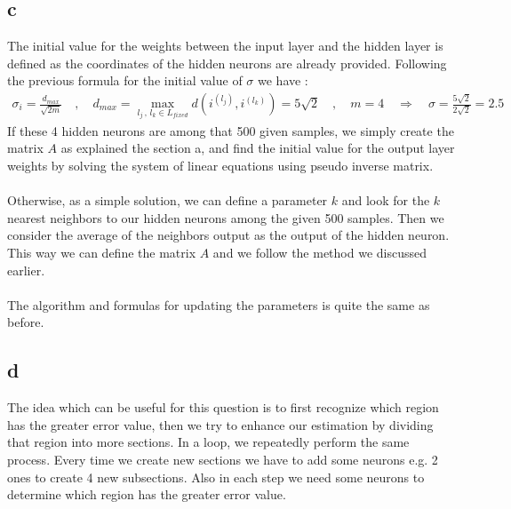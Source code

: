 \documentclass[]{article}
\begin{document}
	\subsection*{c}
	The initial value for the weights between the input layer and the hidden layer is defined as the coordinates of the hidden neurons are already provided. Following the previous formula for the initial value of $\sigma$ we have :
	\begin{align*}
		\sigma_i = \frac{d_{max}}{\sqrt{2m}} \quad , \quad d_{max} = \max_{l_j \, , \, l_k \in L_{fixed}} d(i^{(l_j)} , i^{(l_k)}) = 5\sqrt{2} \quad , \quad m = 4 \quad \Rightarrow \quad \sigma = \frac{5\sqrt{2}}{2\sqrt{2}} = 2.5
	\end{align*}
	If these 4 hidden neurons are among that 500 given samples, we simply create the matrix $A$ as explained the section a, and find the initial value for the output layer weights by solving the system of linear equations using pseudo inverse matrix.\\\\
	Otherwise, as a simple solution, we can define a parameter $k$ and look for the $k$ nearest neighbors to our hidden neurons among the given 500 samples. Then we consider the average of the neighbors output as the output of the hidden neuron. This way we can define the matrix $A$ and we follow the method we discussed earlier.\\\\
	The algorithm and formulas for updating the parameters is quite the same as before. 
	
	\subsection*{d}
	The idea which can be useful for this question is to first recognize which region has the greater error value, then we try to enhance our estimation by dividing that region into more sections. In a loop, we repeatedly perform the same process. Every time we create new sections we have to add some neurons e.g. 2 ones to create 4 new subsections. Also in each step we need some neurons to determine which region has the greater error value.
	
\end{document}
